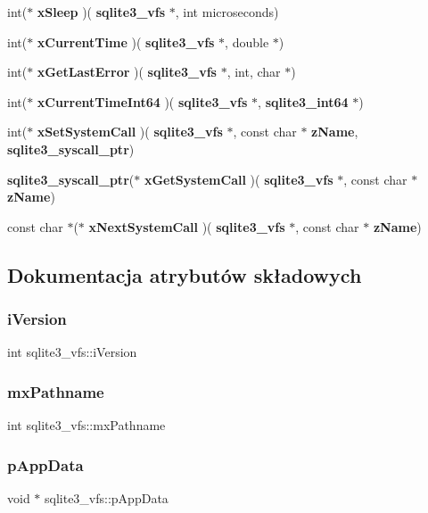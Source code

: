 \begin{DoxyCompactItemize}
\item 
int($\ast$ \textbf{ x\+Sleep} )(\textbf{ sqlite3\+\_\+vfs} $\ast$, int microseconds)
\item 
int($\ast$ \textbf{ x\+Current\+Time} )(\textbf{ sqlite3\+\_\+vfs} $\ast$, double $\ast$)
\item 
int($\ast$ \textbf{ x\+Get\+Last\+Error} )(\textbf{ sqlite3\+\_\+vfs} $\ast$, int, char $\ast$)
\item 
int($\ast$ \textbf{ x\+Current\+Time\+Int64} )(\textbf{ sqlite3\+\_\+vfs} $\ast$, \textbf{ sqlite3\+\_\+int64} $\ast$)
\item 
int($\ast$ \textbf{ x\+Set\+System\+Call} )(\textbf{ sqlite3\+\_\+vfs} $\ast$, const char $\ast$\textbf{ z\+Name}, \textbf{ sqlite3\+\_\+syscall\+\_\+ptr})
\item 
\textbf{ sqlite3\+\_\+syscall\+\_\+ptr}($\ast$ \textbf{ x\+Get\+System\+Call} )(\textbf{ sqlite3\+\_\+vfs} $\ast$, const char $\ast$\textbf{ z\+Name})
\item 
const char $\ast$($\ast$ \textbf{ x\+Next\+System\+Call} )(\textbf{ sqlite3\+\_\+vfs} $\ast$, const char $\ast$\textbf{ z\+Name})
\end{DoxyCompactItemize}


\subsection{Dokumentacja atrybutów składowych}
\mbox{\label{structsqlite3__vfs_a694dd264949bd163545fe174510ed019}} 
\subsubsection{iVersion}
{\footnotesize\ttfamily int sqlite3\+\_\+vfs\+::i\+Version}

\mbox{\label{structsqlite3__vfs_adb2d82c74891b00b5529fb94e7710135}} 
\subsubsection{mxPathname}
{\footnotesize\ttfamily int sqlite3\+\_\+vfs\+::mx\+Pathname}

\mbox{\label{structsqlite3__vfs_a8de686c5e679ba421479ac96d6654527}} 
\subsubsection{pAppData}
{\footnotesize\ttfamily void $\ast$ sqlite3\+\_\+vfs\+::p\+App\+Data}

